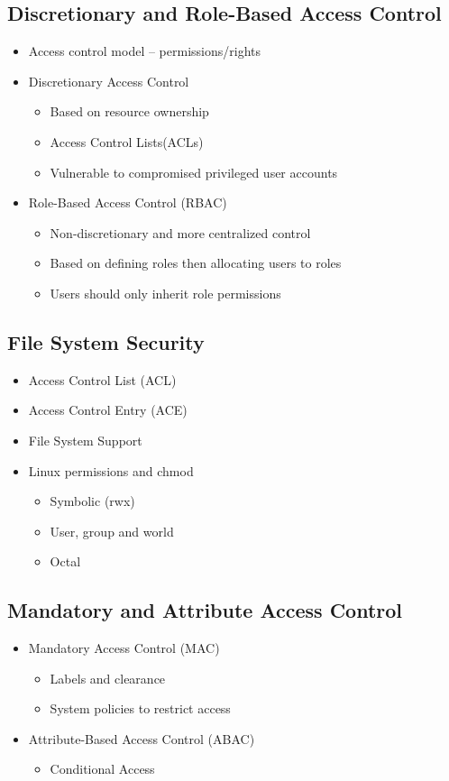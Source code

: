 	\subsection {Discretionary and Role-Based Access Control}
		\begin{itemize}
			\item Access control model -- permissions/rights
			\item Discretionary Access Control
				\begin{itemize}
					\item Based on resource ownership
					\item Access Control Lists(ACLs)
					\item Vulnerable to compromised privileged user accounts
				\end{itemize}
			\item Role-Based Access Control (RBAC)
				\begin{itemize}
					\item Non-discretionary and more centralized control
					\item Based on defining roles then allocating users to roles
					\item Users should only inherit role permissions
				\end{itemize}
		\end{itemize}
	\subsection {File System Security}
		\begin{itemize}
			\item Access Control List (ACL)
			\item Access Control Entry (ACE)
			\item File System Support
			\item Linux permissions and chmod
				\begin{itemize}
					\item Symbolic (rwx)
					\item User, group and world
					\item Octal
				\end{itemize}
		\end{itemize}
	\subsection {Mandatory and Attribute Access Control}
		\begin{itemize}
			\item Mandatory Access Control (MAC)
				\begin{itemize}
					\item Labels and clearance
					\item System policies to restrict access
				\end{itemize}
			\item Attribute-Based Access Control (ABAC)
				\begin{itemize}
					\item Conditional Access
				\end{itemize}
		\end{itemize}
